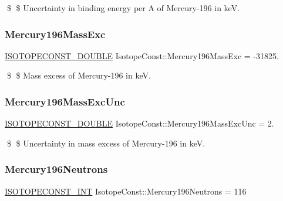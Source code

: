 \$ \$ Uncertainty in binding energy per A of Mercury-\/196 in keV. \mbox{\label{group___isotope_const-_mercury-_hg196_ga85898365a84521449281bafbb569876e}} 
\subsubsection{\texorpdfstring{Mercury196\+Mass\+Exc}{Mercury196MassExc}}
{\footnotesize\ttfamily \mbox{\hyperlink{group___isotope_const-_macros_ga8f45a7272ce02c0b4c65c44636ed719a}{I\+S\+O\+T\+O\+P\+E\+C\+O\+N\+S\+T\+\_\+\+D\+O\+U\+B\+LE}} Isotope\+Const\+::\+Mercury196\+Mass\+Exc = -\/31825.}

\$ \$ Mass excess of Mercury-\/196 in keV. \mbox{\label{group___isotope_const-_mercury-_hg196_ga435b7cda53d96e75f505e72fe8af39d0}} 
\subsubsection{\texorpdfstring{Mercury196\+Mass\+Exc\+Unc}{Mercury196MassExcUnc}}
{\footnotesize\ttfamily \mbox{\hyperlink{group___isotope_const-_macros_ga8f45a7272ce02c0b4c65c44636ed719a}{I\+S\+O\+T\+O\+P\+E\+C\+O\+N\+S\+T\+\_\+\+D\+O\+U\+B\+LE}} Isotope\+Const\+::\+Mercury196\+Mass\+Exc\+Unc = 2.}

\$ \$ Uncertainty in mass excess of Mercury-\/196 in keV. \mbox{\label{group___isotope_const-_mercury-_hg196_ga0ce7c6a9947a4b28180b8a1f8f0d9050}} 
\subsubsection{\texorpdfstring{Mercury196\+Neutrons}{Mercury196Neutrons}}
{\footnotesize\ttfamily \mbox{\hyperlink{group___isotope_const-_macros_ga5f18360b3e99483a35c32d789e62621c}{I\+S\+O\+T\+O\+P\+E\+C\+O\+N\+S\+T\+\_\+\+I\+NT}} Isotope\+Const\+::\+Mercury196\+Neutrons = 116}

